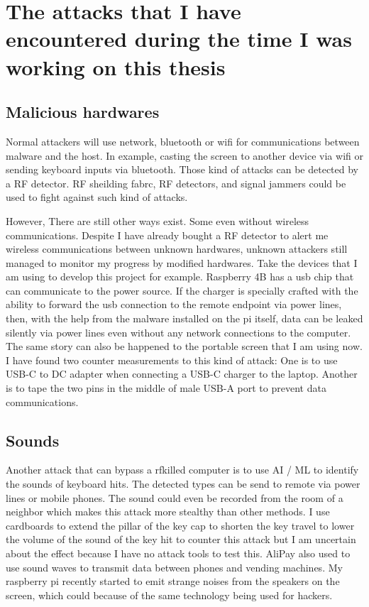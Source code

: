 \documentclass[mscthesis]{usiinfthesis}
\begin{document}
\chapter{The attacks that I have encountered during the time I was working on this thesis}

\section{Malicious hardwares}

Normal attackers will use network, bluetooth or wifi for communications between malware and the host. In example, casting the screen to another device via wifi or sending keyboard inputs via bluetooth. Those kind of attacks can be detected by a RF detector. RF sheilding fabrc, RF detectors, and signal jammers could be used to fight against such kind of attacks.\par
However, There are still other ways exist. Some even without wireless communications. Despite I have already bought a RF detector to alert me wireless communications between unknown hardwares, unknown attackers still managed to monitor my progress by modified hardwares. Take the devices that I am using to develop this project for example. Raspberry 4B has a usb chip that can communicate to the power source. If the charger is specially crafted with the ability to forward the usb connection to the remote endpoint via power lines, then, with the help from the malware installed on the pi itself, data can be leaked silently via power lines even without any network connections to the computer. The same story can also be happened to the portable screen that I am using now. I have found two counter measurements to this kind of attack: One is to use USB-C to DC adapter when connecting a USB-C charger to the laptop. Another is to tape the two pins in the middle of male USB-A port to prevent data communications.

\section{Sounds}

Another attack that can bypass a rfkilled computer is to use AI / ML to identify the sounds of keyboard hits. The detected types can be send to remote via power lines or mobile phones. The sound could even be recorded from the room of a neighbor which makes this attack more stealthy than other methods. I use cardboards to extend the pillar of the key cap to shorten the key travel to lower the volume of the sound of the key hit to counter this attack but I am uncertain about the effect because I have no attack tools to test this. AliPay also used to use sound waves to transmit data between phones and vending machines. My raspberry pi recently started to emit strange noises from the speakers on the screen, which could because of the same technology being used for hackers.
\end{document}
